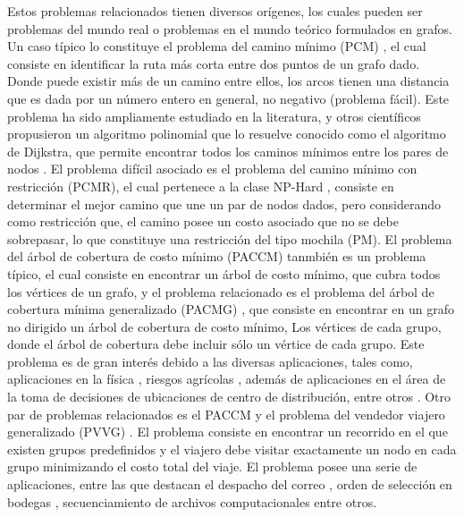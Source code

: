 Estos problemas relacionados tienen diversos orígenes, los cuales pueden ser problemas del mundo real o problemas en el mundo teórico formulados en grafos. 
Un caso típico lo constituye el problema del camino mínimo (PCM) \citep{papadimitriou1982combinatorial}, el cual consiste en identificar la ruta más corta entre dos puntos de un grafo dado. Donde puede existir más de un camino entre ellos, los arcos tienen una distancia que es dada por un número entero en general, no negativo (problema fácil). Este problema ha sido ampliamente estudiado en la literatura, \cite{dijkstra1959note} y otros científicos propusieron un algoritmo polinomial que lo resuelve conocido como el algoritmo de Dijkstra, que permite encontrar todos los caminos mínimos entre los pares de nodos \citep{cook1995combinatorial}. El problema difícil asociado es el problema del camino mínimo con restricción (PCMR), el cual pertenece a la clase NP-Hard \citep{handler1980dual}, consiste en determinar el mejor camino que une un par de nodos dados, pero considerando como restricción que, el camino posee un costo asociado que no se debe sobrepasar, lo que constituye una restricción del tipo mochila (PM). El problema del árbol de cobertura de costo mínimo (PACCM)\citep{papadimitriou1982combinatorial} tanmbién es un problema típico, el cual consiste en encontrar un árbol de costo mínimo, que cubra todos los vértices de un grafo, y el problema relacionado es el problema del árbol de cobertura mínima generalizado (PACMG) \citep{dror2000generalized}, que consiste en encontrar en un grafo no dirigido un árbol de cobertura de costo mínimo, Los vértices de cada grupo, donde el árbol de cobertura debe incluir sólo un vértice de cada grupo. Este problema es de gran interés debido  a las diversas aplicaciones, tales como, aplicaciones en la física \citep{kansal2001globally}, riesgos agrícolas \citep{dror2000generalized}, además de aplicaciones en el área de la toma de decisiones de ubicaciones de centro de distribución, entre otros \citep{myung1995generalized}. Otro par de problemas relacionados es el PACCM y el problema del vendedor viajero generalizado (PVVG) \citep{srivastava1969generalized}. El problema consiste en encontrar un recorrido en el que existen grupos predefinidos y el viajero debe visitar exactamente un nodo en cada grupo minimizando el costo total del viaje. El problema posee una serie de aplicaciones, entre las que destacan el despacho del correo \citep{laporte1996some}, orden de selección en bodegas \citep{noon1991lagrangian}, secuenciamiento de archivos computacionales \citep{henrylab1969record} entre otros.

